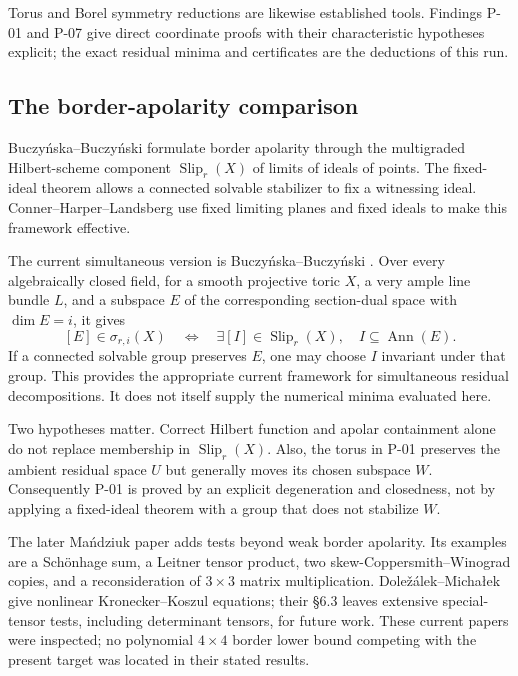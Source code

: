 Torus and Borel symmetry reductions are likewise established
tools. Findings P-01 and P-07 give direct coordinate proofs
with their characteristic hypotheses explicit; the exact
residual minima and certificates are the deductions of this run.

\subsection{The border-apolarity comparison}

Buczy\'nska--Buczy\'nski
\cite[Theorem~3.15, p.~15; Theorem~4.3, p.~18;
Corollary~4.5, p.~19]{BB2021} formulate border apolarity through
the multigraded Hilbert-scheme component
$\operatorname{Slip}_r(X)$ of limits of ideals of points.
The fixed-ideal theorem allows a connected solvable stabilizer
to fix a witnessing ideal. Conner--Harper--Landsberg
\cite[Theorems~2.3--2.4, \S2.3]{CHL2023} use fixed limiting
planes and fixed ideals to make this framework effective.

The current simultaneous version is
Buczy\'nska--Buczy\'nski
\cite[\S4.3, Theorem~4.7; field convention at the start of
\S1]{BB2026}. Over every algebraically closed field, for a
smooth projective toric $X$, a very ample line bundle $L$,
and a subspace $E$ of the corresponding section-dual space
with $\dim E=i$, it gives
\[
 [E]\in\sigma_{r,i}(X)
 \quad\Longleftrightarrow\quad
 \exists[I]\in\operatorname{Slip}_r(X),\quad I\subseteq\operatorname{Ann}(E).
\]
If a connected solvable group preserves $E$, one may choose
$I$ invariant under that group. This provides the appropriate
current framework for simultaneous residual decompositions.
It does not itself supply the numerical minima evaluated here.

Two hypotheses matter. Correct Hilbert function and apolar
containment alone do not replace membership in
$\operatorname{Slip}_r(X)$. Also, the torus in P-01 preserves
the ambient residual space $U$ but generally moves its chosen
subspace $W$. Consequently P-01 is proved by an explicit
degeneration and closedness, not by applying a fixed-ideal
theorem with a group that does not stabilize $W$.

The later Ma\'ndziuk paper
\cite[Theorems~1.1--1.3, p.~2; Theorems~3.5, 4.4, 5.2;
\S6]{Mandziuk2026} adds tests beyond weak border apolarity.
Its examples are a Sch\"onhage sum, a Leitner tensor product,
two skew-Coppersmith--Winograd copies, and a reconsideration
of $3\times3$ matrix multiplication. Dole\v z\'alek--Micha\l ek
\cite[Theorem~1.1; \S5.1; \S6.3]{DM2026} give nonlinear
Kronecker--Koszul equations; their \S6.3 leaves extensive
special-tensor tests, including determinant tensors, for
future work. These current papers were inspected; no
polynomial $4\times4$ border lower bound competing with
the present target was located in their stated results.

